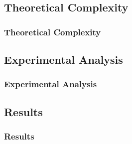 \documentclass[aspectratio=169]{beamer}
\begin{document}
\subsection{Theoretical Complexity}
\begin{frame}
  \frametitle{Theoretical Complexity}
\end{frame}
\subsection{Experimental Analysis}
\begin{frame}
  \frametitle{Experimental Analysis}
\end{frame}
\subsection{Results}
\begin{frame}
  \frametitle{Results}
\end{frame}


\end{document}
